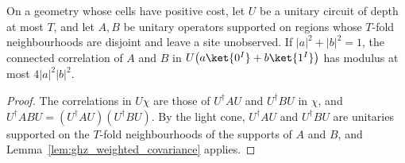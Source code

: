 \begin{theorem}
    \label{thm:ghz_weighted_covariance_circuit}
    \leanok
    On a geometry whose cells have positive cost, let $U$ be a unitary circuit of depth at most
    $T$, and let $A,B$ be unitary operators supported on regions whose $T$-fold neighbourhoods
    are disjoint and leave a site unobserved. If $|a|^2+|b|^2=1$, the connected correlation of
    $A$ and $B$ in $U\bigl(a\ket{0^I}+b\ket{1^I}\bigr)$ has modulus at most $4|a|^2|b|^2$.
\end{theorem}
\begin{proof}
    \leanok
    The correlations in $U\chi$ are those of $U^\dagger AU$ and $U^\dagger BU$ in $\chi$, and
    $U^\dagger ABU=(U^\dagger AU)(U^\dagger BU)$. By the light cone, $U^\dagger AU$ and
    $U^\dagger BU$ are unitaries supported on the $T$-fold neighbourhoods of the supports of
    $A$ and $B$, and Lemma~\ref{lem:ghz_weighted_covariance} applies.
\end{proof}
